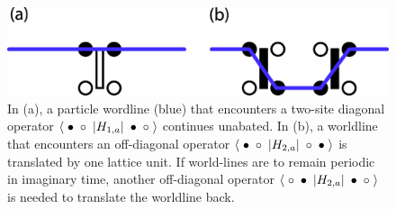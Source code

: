 \documentclass[vecphys]{svmult}
\begin{document}
\begin{figure}[t]
\centering
\includegraphics*[width=.7\textwidth]{diag_offdiag.eps}
\caption[]{In (a), a particle wordline (blue) that encounters a two-site diagonal operator $\langle \hspace{1mm} \bullet \hspace{1mm}  \circ \hspace{1mm}  | H_{1,a} | \hspace{1mm} \bullet \hspace{1mm} \circ \hspace{1mm} \rangle$ continues unabated.  In (b), a worldline that encounters an off-diagonal operator $\langle \hspace{1mm} \bullet \hspace{1mm}  \circ \hspace{1mm}  | H_{2,a} | \hspace{1mm} \circ \hspace{1mm} \bullet \hspace{1mm} \rangle $ is translated by one lattice unit.  If world-lines are to remain periodic in imaginary time, another off-diagonal operator $\langle \hspace{1mm} \circ \hspace{1mm}  \bullet \hspace{1mm}  | H_{2,a} | \hspace{1mm} \bullet \hspace{1mm} \circ \hspace{1mm} \rangle$ is needed to translate the worldline back.}
\label{fig:1}       %
\end{figure} 
\end{document}
